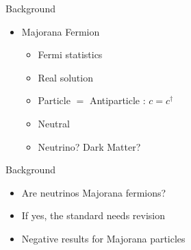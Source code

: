 \documentclass[xcolor=dvipsnames,10pt,aspectratio=169]{beamer}
\newcommand{\BD}{Background}
\begin{document}
\begin{frame}{\BD}
\begin{multicols}{2}
      \begin{itemize}
        \setlength\itemsep{0pt}
        \small
        \item[] Majorana Fermion
        \begin{itemize}
          \setlength\itemsep{0pt}
            \item Fermi statistics
            \item Real solution
            \item Particle $=$ Antiparticle : $c = c^{\dagger}$
            \item Neutral
            \item Neutrino? Dark Matter?
        \end{itemize}
      \end{itemize}

    \end{multicols}

  \end{frame}

  \begin{frame}{\BD}
    \begin{multicols}{2}
      \centering

      \begin{itemize}
          \item Are neutrinos Majorana fermions?
          \item If yes, the standard needs revision
          \item Negative results for Majorana particles
      \end{itemize}

    \end{multicols}
  \end{frame}
\end{document}
